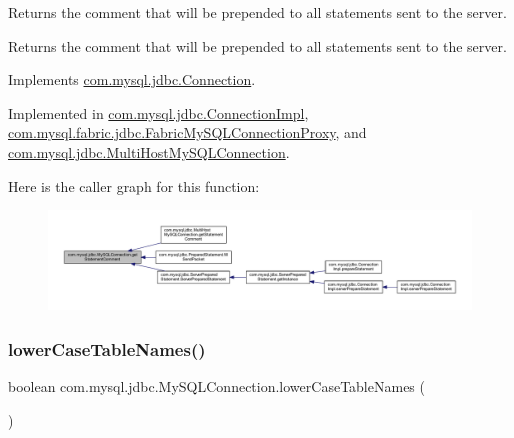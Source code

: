 Returns the comment that will be prepended to all statements sent to the server.

\begin{DoxyReturn}{Returns}
the comment that will be prepended to all statements sent to the server. 
\end{DoxyReturn}


Implements \mbox{\hyperlink{interfacecom_1_1mysql_1_1jdbc_1_1_connection_a9db688dc671cce2bd98b3f34128981f8}{com.\+mysql.\+jdbc.\+Connection}}.



Implemented in \mbox{\hyperlink{classcom_1_1mysql_1_1jdbc_1_1_connection_impl_af8522a313fec84a2460afa40889e3595}{com.\+mysql.\+jdbc.\+Connection\+Impl}}, \mbox{\hyperlink{classcom_1_1mysql_1_1fabric_1_1jdbc_1_1_fabric_my_s_q_l_connection_proxy_aac900a94d9228e2b4f0c50cacee5feeb}{com.\+mysql.\+fabric.\+jdbc.\+Fabric\+My\+S\+Q\+L\+Connection\+Proxy}}, and \mbox{\hyperlink{classcom_1_1mysql_1_1jdbc_1_1_multi_host_my_s_q_l_connection_a9d4bbb42860206a659b53b3d5441fac3}{com.\+mysql.\+jdbc.\+Multi\+Host\+My\+S\+Q\+L\+Connection}}.

Here is the caller graph for this function\+:
\nopagebreak
\begin{figure}[H]
\begin{center}
\leavevmode
\includegraphics[width=350pt]{interfacecom_1_1mysql_1_1jdbc_1_1_my_s_q_l_connection_aca7bbebb7ec6fa745218e6dca38cfaad_icgraph}
\end{center}
\end{figure}
\mbox{\label{interfacecom_1_1mysql_1_1jdbc_1_1_my_s_q_l_connection_a5b25c6fb6c56e77ebc6989179da0dd75}} 
\subsubsection{\texorpdfstring{lower\+Case\+Table\+Names()}{lowerCaseTableNames()}}
{\footnotesize\ttfamily boolean com.\+mysql.\+jdbc.\+My\+S\+Q\+L\+Connection.\+lower\+Case\+Table\+Names (\begin{DoxyParamCaption}{ }\end{DoxyParamCaption})}

